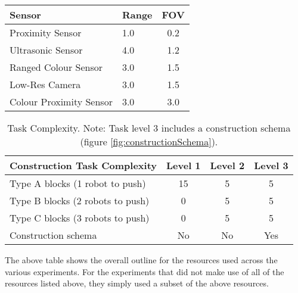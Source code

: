 \begin{table}
\begin{tabular}{llc}
		\hline
		Sensor                                                 & Range     & FOV \\
		\hline
		Proximity Sensor		                               & 	1.0	   &  0.2  \\
		Ultrasonic Sensor		                               &	4.0    &  1.2  \\
		Ranged Colour Sensor	                               &	3.0	   &  1.5 \\
		Low-Res Camera			                               & 	3.0	   &  1.5 \\
		Colour Proximity Sensor                                & 	3.0	   &  3.0 \\
		\hline
	\end{tabular}
\end{table}



\begin{table}[t]
	\renewcommand{\arraystretch}{1.30}
	\caption{Task Complexity. Note: Task level 3 includes a construction schema (figure \ref{fig:constructionSchema}).}\label{tab:taskComplexity}
	\centering
	\begin{tabular}{lccc}
		\hline
		Construction Task Complexity                               & Level 1     & Level 2    & Level 3   \\
		\hline
		Type A blocks (1 robot to push)	                           & 	15	     & 5          & 5  \\
		Type B blocks (2 robots to push)		                   &	0 	     & 5          & 5  \\
		Type C blocks (3 robots to push)	                       &  	0	     & 5          & 5  \\
		Construction schema                                        &   No        & No         &	Yes \\
\hline
	\end{tabular}
\end{table}

The above table shows the overall outline for the resources used across the various experiments.
For the experiments that did not make use of all of the resources listed above, they simply used a subset 
of the above resources.




